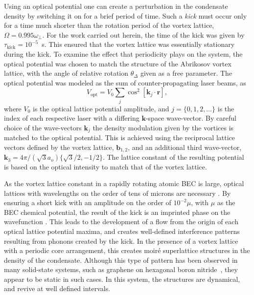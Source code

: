 Using an optical potential one can create a perturbation in the condensate density by switching it on for a brief period of time. Such a {\it kick} must occur only for a time much shorter than the rotation period of the vortex lattice, $\Omega = 0.995\omega_\perp$. For the work carried out herein, the time of the kick was given by $\tau_{\text{kick}}=10^{-5}$~s. This ensured that the vortex lattice was essentially stationary during the kick. To examine the effect that periodicity plays on the system, the optical potential was chosen to match the structure of the Abrikosov vortex lattice, with the angle of relative rotation $\theta_\Delta$ given as a free parameter. The optical potential was modeled as the sum of counter-propagating laser beams, as
\begin{equation}
    V_{\text{opt}} = V_0\displaystyle\sum_{j}\cos^2 \left[ \textbf{k}_{j}\cdot\textbf{r} \right],
\end{equation}
where $V_0$ is the optical lattice potential amplitude, and $j=\lbrace 0,1,2,\ldots \rbrace$ is the index of each respective laser with a differing $\mathbf{k}$-space wave-vector. By careful choice of the wave-vectors $\textbf{k}_{j}$ the density modulation given by the vortices is matched to the optical potential. This is achieved using the reciprocal lattice vectors defined by the vortex lattice, $\mathbf{b}_{1,2}$, and an additional third wave-vector, $\mathbf{k}_3 = 4\pi/(\sqrt{3}a_o)\{\sqrt{3}/2,-1/2\}$. The lattice constant of the resulting potential is based on the optical intensity to match that of the vortex lattice.


As the vortex lattice constant in a rapidly rotating atomic BEC is large, optical lattices with wavelengths on the order of tens of microns are necessary \cite{BEC:Fallani_optexp_2005, AO:Williams_optexp_2008}. By ensuring a short kick with an amplitude on the order of $10^{-2} \mu $, with $\mu$ as the BEC chemical potential, the result of the kick is an imprinted phase on the wavefunction \cite{Vtx:Dobrek_pra_1999}. This leads to the development of a flow from the origin of each optical lattice potential maxima, and creates well-defined interference patterns resulting from phonons created by the kick. In the presence of a vortex lattice with a periodic core arrangement, this creates moir\'e superlattice structures \cite{SS:Murata_acsn_2010} in the density of the condensate. Although this type of pattern has been observed in many solid-state systems, such as graphene on hexagonal boron nitride~\cite{SS:Yankowitz_natphys_2012}, they appear to be static in such cases. In this system, the structures are dynamical, and revive at well defined intervals.


